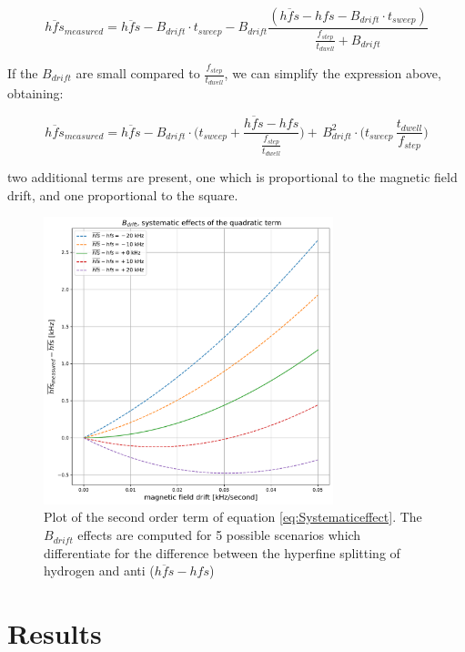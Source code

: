 \documentclass[11pt,a4paper,oneside]{article}
\begin{document}
\begin{equation} \label{eq:Systematiceffect}
\overline{hfs}_{measured} = \overline{hfs} - B_{drift} \cdot t_{sweep} - B_{drift}  \dfrac{(\overline{hfs} - hfs - B_{drift} \cdot t_{sweep})}{ \frac{f_{step}}{t_{dwell}} + B_{drift}}
\end{equation}

If the $B_{drift}$ are small compared to $\frac{f_{step}}{t_{dwell}}$, we can simplify the expression above, obtaining:

\begin{equation}
\overline{hfs}_{measured} = \overline{hfs} - B_{drift} \cdot \biggl(t_{sweep} + \frac{ \overline{hfs} - hfs}{\frac{f_{step}}{t_{dwell}}} \biggl) + \, B_{drift}^{2} \cdot \biggl( t_{sweep} \, \frac{t_{dwell}}{f_{step}} \biggl)
\end{equation}

two additional terms are present, one which is proportional to the magnetic field drift, and one proportional to the square.
\newpage
\begin{figure}[hbtp]
\centering
\includegraphics[width = 0.75\textwidth]{SecondOrderTerm.pdf}
\caption{Plot of the second order term of equation \ref{eq:Systematiceffect}. The $B_{drift}$ effects are computed for 5 possible scenarios which differentiate for the difference between the hyperfine splitting of hydrogen and anti ($\overline{hfs} - hfs$) }
\end{figure}


\section{Results}
\end{document}
